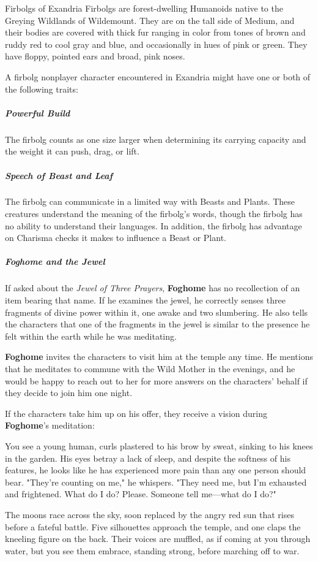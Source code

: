 \documentclass[10pt,a4paper,twoside,bg=print,twocolumn,openany,nodeprecatedcode]{dndbook}
\begin{document}
\begin{DndSidebar}[float=!b]{Firbolgs of Exandria}
Firbolgs are forest-dwelling Humanoids native to the Greying Wildlands of Wildemount. They are on the tall side of Medium, and their bodies are covered with thick fur ranging in color from tones of brown and ruddy red to cool gray and blue, and occasionally in hues of pink or green. They have floppy, pointed ears and broad, pink noses.



A firbolg nonplayer character encountered in Exandria might have one or both of the following traits:



\subparagraph{Powerful Build}
The firbolg counts as one size larger when determining its carrying capacity and the weight it can push, drag, or lift.



\subparagraph{Speech of Beast and Leaf}
The firbolg can communicate in a limited way with Beasts and Plants. These creatures understand the meaning of the firbolg's words, though the firbolg has no ability to understand their languages. In addition, the firbolg has advantage on Charisma checks it makes to influence a Beast or Plant.



\end{DndSidebar}

\subparagraph{Foghome and the Jewel}
If asked about the \textit{Jewel of Three Prayers}, \textbf{Foghome} has no recollection of an item bearing that name. If he examines the jewel, he correctly senses three fragments of divine power within it, one awake and two slumbering. He also tells the characters that one of the fragments in the jewel is similar to the presence he felt within the earth while he was meditating.

\textbf{Foghome} invites the characters to visit him at the temple any time. He mentions that he meditates to commune with the Wild Mother in the evenings, and he would be happy to reach out to her for more answers on the characters' behalf if they decide to join him one night.

If the characters take him up on his offer, they receive a vision during \textbf{Foghome}'s meditation:

\begin{DndReadAloud}{}
You see a young human, curls plastered to his brow by sweat, sinking to his knees in the garden. His eyes betray a lack of sleep, and despite the softness of his features, he looks like he has experienced more pain than any one person should bear. "They're counting on me," he whispers. "They need me, but I'm exhausted and frightened. What do I do? Please. Someone tell me—what do I do?"

The moons race across the sky, soon replaced by the angry red sun that rises before a fateful battle. Five silhouettes approach the temple, and one claps the kneeling figure on the back. Their voices are muffled, as if coming at you through water, but you see them embrace, standing strong, before marching off to war.

\end{DndReadAloud}
\end{document}
